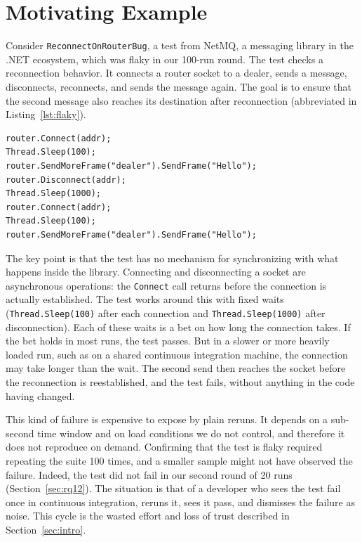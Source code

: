 \section{Motivating Example}
\label{sec:motivation}

Consider \texttt{ReconnectOnRouterBug}, a test from NetMQ, a messaging library in the .NET ecosystem, which was flaky in our 100-run round. The test checks a reconnection behavior. It connects a router socket to a dealer, sends a message, disconnects, reconnects, and sends the message again. The goal is to ensure that the second message also reaches its destination after reconnection (abbreviated in Listing~\ref{lst:flaky}). 

\begin{listing}[!htbp]
\begin{lstlisting}[language={[Sharp]C}, basicstyle=\ttfamily\footnotesize, columns=fullflexible, keepspaces=true, backgroundcolor={}, frame=tb, framerule=0.4pt, numberstyle=\tiny\color{black!45}, numbersep=4pt, xleftmargin=1em, framexleftmargin=1em, breaklines=false, emph={Sleep}, emphstyle={\color{red!70!black}\bfseries}]
router.Connect(addr);
Thread.Sleep(100);
router.SendMoreFrame("dealer").SendFrame("Hello");
router.Disconnect(addr);
Thread.Sleep(1000);
router.Connect(addr);
Thread.Sleep(100);
router.SendMoreFrame("dealer").SendFrame("Hello");
\end{lstlisting}
\caption{Flaky test with fixed waits (abbreviated).}
\label{lst:flaky}
\end{listing}

The key point is that the test has no mechanism for synchronizing with what happens inside the library. Connecting and disconnecting a socket are asynchronous operations: the \texttt{Connect} call returns before the connection is actually established. The test works around this with fixed waits (\texttt{Thread.Sleep(100)} after each connection and \texttt{Thread.Sleep(1000)} after disconnection). Each of these waits is a bet on how long the connection takes. If the bet holds in most runs, the test passes. But in a slower or more heavily loaded run, such as on a shared continuous integration machine, the connection may take longer than the wait. The second send then reaches the socket before the reconnection is reestablished, and the test fails, without anything in the code having changed.

This kind of failure is expensive to expose by plain reruns. It depends on a sub-second time window and on load conditions we do not control, and therefore it does not reproduce on demand. Confirming that the test is flaky required repeating the suite 100 times, and a smaller sample might not have observed the failure. Indeed, the test did not fail in our second round of 20 runs (Section~\ref{sec:rq12}). The situation is that of a developer who sees the test fail once in continuous integration, reruns it, sees it pass, and dismisses the failure as noise. This cycle is the wasted effort and loss of trust described in Section~\ref{sec:intro}.

